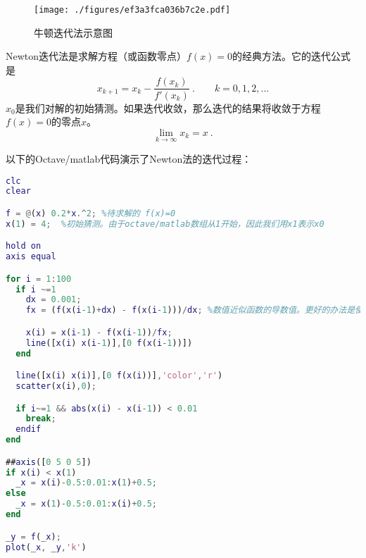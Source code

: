 

\begin{figure}[ht]
\centering
\texttt{[image: ./figures/ef3a3fca036b7c2e.pdf]}
\caption{牛顿迭代法示意图} \label{fig_NWTNRT_1}
\end{figure}

Newton迭代法是求解方程（或函数零点）$f(x)=0$的经典方法。它的迭代公式是
\begin{equation}
x_{k+1} = x_k-\frac{f(x_k)}{f'(x_k)}~. \qquad k=0,1,2,...
\end{equation}
$x_0$是我们对解的初始猜测。如果迭代收敛，那么迭代的结果将收敛于方程$f(x)=0$的零点$x$。
$$\lim_{k\to\infty} x_k = x~.$$

以下的Octave/matlab代码演示了Newton法的迭代过程：
\begin{lstlisting}[language=matlab]
clc
clear

f = @(x) 0.2*x.^2; %待求解的 f(x)=0
x(1) = 4;  %初始猜测。由于octave/matlab数组从1开始，因此我们用x1表示x0

hold on
axis equal

for i = 1:100
  if i ~=1
    dx = 0.001;
    fx = (f(x(i-1)+dx) - f(x(i-1)))/dx; %数值近似函数的导数值。更好的办法是使用三点牛顿法。

    x(i) = x(i-1) - f(x(i-1))/fx;
    line([x(i) x(i-1)],[0 f(x(i-1))])
  end

  line([x(i) x(i)],[0 f(x(i))],'color','r')
  scatter(x(i),0);

  if i~=1 && abs(x(i) - x(i-1)) < 0.01
    break;
  endif
end

##axis([0 5 0 5])
if x(i) < x(1)
  _x = x(i)-0.5:0.01:x(1)+0.5;
else
  _x = x(1)-0.5:0.01:x(i)+0.5;
end

_y = f(_x);
plot(_x, _y,'k')
\end{lstlisting}
